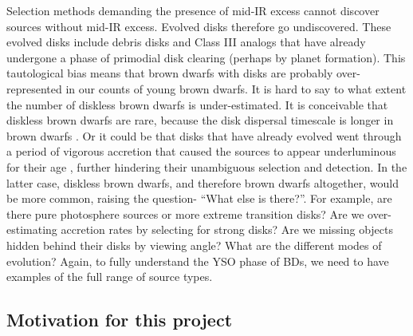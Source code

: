 Selection methods demanding the presence of mid-IR excess cannot discover sources without mid-IR excess.  Evolved disks therefore go undiscovered.  These evolved disks include debris disks and Class III analogs that have already undergone a phase of primodial disk clearing (perhaps by planet formation).  This tautological bias means that brown dwarfs with disks are probably over-represented in our counts of young brown dwarfs.  It is hard to say to what extent the number of diskless brown dwarfs is under-estimated.  It is conceivable that diskless brown dwarfs are rare, because the disk dispersal timescale is longer in brown dwarfs \citep{2008ApJ...681.1584R}.  Or it could be that disks that have already evolved went through a period of vigorous accretion that caused the sources to appear underluminous for their age \citep{2009ApJ...702L..27B}, further hindering their unambiguous selection and detection.  In the latter case, diskless brown dwarfs, and therefore brown dwarfs altogether, would be more common, raising the question- ``What else is there?''.  For example, are there pure photosphere sources or more extreme transition disks?  Are we over-estimating accretion rates by selecting for strong disks?  Are we missing objects hidden behind their disks by viewing angle?  What are the different modes of evolution?  Again, to fully understand the YSO phase of BDs, we need to have examples of the full range of source types. 


\subsection{Motivation for this project}


